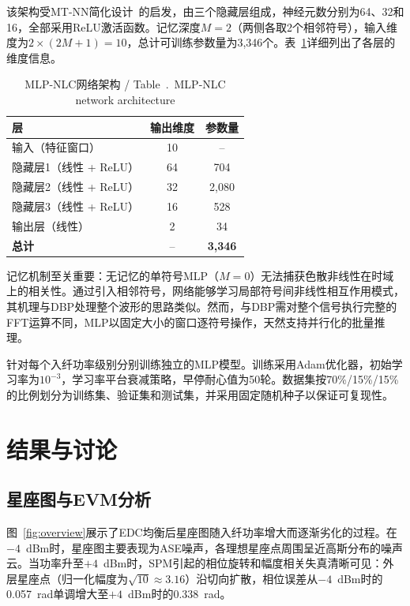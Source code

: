\documentclass[conference]{IEEEtran}
\begin{document}
该架构受MT-NN简化设计~\cite{mtnn2025}的启发，由三个隐藏层组成，神经元数分别为64、32和16，全部采用ReLU激活函数。记忆深度$M = 2$（两侧各取2个相邻符号），输入维度为$2 \times (2M + 1) = 10$，总计可训练参数量为3,346个。表~\ref{tab:arch}详细列出了各层的维度信息。

\begin{table}[h]
\centering
\caption{MLP-NLC网络架构 / Table~\thetable.~MLP-NLC network architecture}
\label{tab:arch}
\begin{tabular}{@{}lcc@{}}
\toprule
\textbf{层} & \textbf{输出维度} & \textbf{参数量} \\
\midrule
输入（特征窗口）  & 10      & -- \\
隐藏层1（线性 + ReLU） & 64     & 704 \\
隐藏层2（线性 + ReLU） & 32     & 2,080 \\
隐藏层3（线性 + ReLU） & 16     & 528 \\
输出层（线性）          & 2      & 34 \\
\midrule
\textbf{总计}           & --     & \textbf{3,346} \\
\bottomrule
\end{tabular}
\end{table}

记忆机制至关重要：无记忆的单符号MLP（$M = 0$）无法捕获色散非线性在时域上的相关性。通过引入相邻符号，网络能够学习局部符号间非线性相互作用模式，其机理与DBP处理整个波形的思路类似。然而，与DBP需对整个信号执行完整的FFT运算不同，MLP以固定大小的窗口逐符号操作，天然支持并行化的批量推理。

针对每个入纤功率级别分别训练独立的MLP模型。训练采用Adam优化器，初始学习率为$10^{-3}$，学习率平台衰减策略，早停耐心值为50轮。数据集按70\%/15\%/15\%的比例划分为训练集、验证集和测试集，并采用固定随机种子以保证可复现性。

\section{结果与讨论}
\label{sec:results}

\subsection{星座图与EVM分析}

图~\ref{fig:overview}展示了EDC均衡后星座图随入纤功率增大而逐渐劣化的过程。在$-4$~dBm时，星座图主要表现为ASE噪声，各理想星座点周围呈近高斯分布的噪声云。当功率升至$+4$~dBm时，SPM引起的相位旋转和幅度相关失真清晰可见：外层星座点（归一化幅度为$\sqrt{10} \approx 3.16$）沿切向扩散，相位误差从$-4$~dBm时的0.057~rad单调增大至$+4$~dBm时的0.338~rad。
\end{document}
